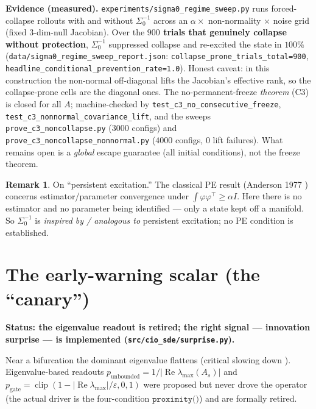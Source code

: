 \documentclass[11pt]{article}
\theoremstyle{definition}
\newtheorem{remark}{Remark}
\DeclareMathOperator*{\Real}{Re}
\begin{document}
\begin{verifybox}
\textbf{Evidence (measured).} \texttt{experiments/sigma0\_regime\_sweep.py} runs
forced-collapse rollouts with and without $\Sigma_0^{-1}$ across an
$\alpha\times$ non-normality $\times$ noise grid (fixed $3$-dim-null Jacobian). Over the
\textbf{$900$ trials that genuinely collapse without protection}, $\Sigma_0^{-1}$
suppressed collapse and re-excited the state in \textbf{$100\%$}
(\texttt{data/sigma0\_regime\_sweep\_report.json}:
\texttt{collapse\_prone\_trials\_total=900},
\texttt{headline\_conditional\_prevention\_rate=1.0}). Honest caveat: in this construction
the non-normal off-diagonal lifts the Jacobian's effective rank, so the collapse-prone
cells are the diagonal ones. The no-permanent-freeze \emph{theorem} (C3) is closed for all
$A$; machine-checked by \texttt{test\_c3\_\allowbreak no\_\allowbreak consecutive\_\allowbreak freeze},
\texttt{test\_c3\_\allowbreak nonnormal\_\allowbreak covariance\_\allowbreak lift}, and the sweeps
\texttt{prove\_c3\_\allowbreak noncollapse.py} ($3000$ configs) and
\texttt{prove\_c3\_\allowbreak noncollapse\_\allowbreak nonnormal.py} ($4000$ configs, $0$
lift failures). What remains open is a \emph{global} escape guarantee (all initial
conditions), not the freeze theorem.
\end{verifybox}

\begin{remark}
On ``persistent excitation.'' The classical PE result (Anderson 1977 \cite{anderson1977})
concerns estimator/parameter convergence under $\int\varphi\varphi^\top\ge\alpha I$. Here
there is no estimator and no parameter being identified --- only a state kept off a
manifold. So $\Sigma_0^{-1}$ is \emph{inspired by / analogous to} persistent excitation; no
PE condition is established.
\end{remark}

\section{The early-warning scalar (the ``canary'')}
\label{sec:canary}
\begin{caveatbox}
\textbf{Status: the eigenvalue readout is retired; the right signal --- innovation surprise
--- is implemented (\texttt{src/cio\_sde/surprise.py}).}
\end{caveatbox}
Near a bifurcation the dominant eigenvalue flattens (critical slowing down
\cite{wissel1984,scheffer2009}). Eigenvalue-based readouts
$p_{\mathrm{unbounded}}=1/|\Real\lambda_{\max}(A_s)|$ and
$p_{\mathrm{gate}}=\operatorname{clip}(1-|\Real\lambda_{\max}|/\varepsilon,0,1)$ were
proposed but never drove the operator (the actual driver is the four-condition
$\texttt{proximity()}$) and are formally retired.
\end{document}
